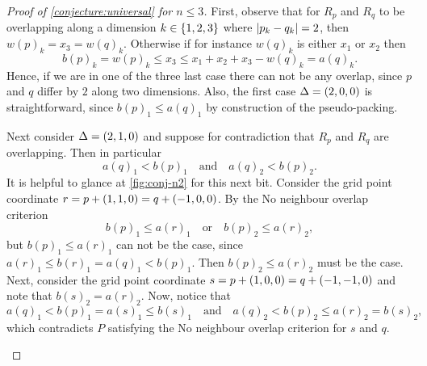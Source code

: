\begin{proof}[Proof of \cref{conjecture:universal} for $n \leq 3$]
First, observe that for $R_p$ and $R_q$ to be overlapping along a dimension $k \in \left\{ 1, 2, 3 \right\}$ where $\lvert p_k - q_k\rvert = 2$, then $w(p)_k = x_3 = w(q)_k$. Otherwise if for instance $w(q)_k$ is either $x_1$ or $x_2$ then
\[
b(p)_k = w(p)_k \leq x_3 \leq x_1 + x_2 + x_3 - w(q)_k = a(q)_k.
\]
Hence, if we are in one of the three last case there can not be any overlap, since $p$ and $q$ differ by $2$ along two dimensions. Also, the first case $\Delta = \left( 2, 0, 0 \right)$ is straightforward, since $b(p)_1 \leq a(q)_1$ by construction of the pseudo-packing.

Next consider $\Delta = \left( 2, 1, 0 \right)$ and suppose for contradiction that $R_p$ and $R_q$ are overlapping. Then in particular
\[
a(q)_1 < b(p)_1 \quad \text{and} \quad a(q)_2 < b(p)_2.
\]
It is helpful to glance at \cref{fig:conj-n2} for this next bit. Consider the grid point coordinate $r = p + \left( 1, 1, 0 \right) = q + \left( -1, 0, 0 \right)$. By the No neighbour overlap criterion 
\[
b(p)_1 \leq a(r)_1 \quad \text{or} \quad b(p)_2 \leq a(r)_2,
\]
but $b(p)_1 \leq a(r)_1$ can not be the case, since $a(r)_1 \leq b(r)_1 = a(q)_1 < b(p)_1$. Then $b(p)_2 \leq a(r)_2$ must be the case. Next, consider the grid point coordinate $s = p + \left( 1, 0, 0 \right) = q + \left( -1, -1, 0 \right)$ and note that $b(s)_2 = a(r)_2$. Now, notice that
\[
a(q)_1 < b(p)_1 = a(s)_1 \leq b(s)_1
\quad \text{and} \quad
a(q)_2 < b(p)_2 \leq a(r)_2 = b(s)_2,
\]
which contradicts $P$ satisfying the No neighbour overlap criterion for $s$ and $q$.
\begin{figure}[ht]
    \centering
\end{figure}
\end{proof}
